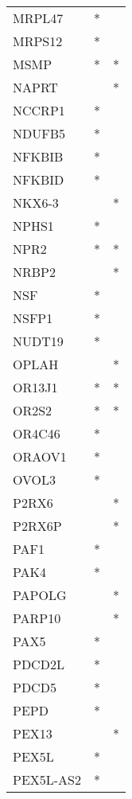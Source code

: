 \begin{longtable}{lcc}
MRPL47       &         * &         \\
MRPS12       &         * &         \\
MSMP         &         * &       * \\
NAPRT        &           &       * \\
NCCRP1       &         * &         \\
NDUFB5       &         * &         \\
NFKBIB       &         * &         \\
NFKBID       &         * &         \\
NKX6-3       &           &       * \\
NPHS1        &         * &         \\
NPR2         &         * &       * \\
NRBP2        &           &       * \\
NSF          &         * &         \\
NSFP1        &         * &         \\
NUDT19       &         * &         \\
OPLAH        &           &       * \\
OR13J1       &         * &       * \\
OR2S2        &         * &       * \\
OR4C46       &         * &         \\
ORAOV1       &         * &         \\
OVOL3        &         * &         \\
P2RX6        &           &       * \\
P2RX6P       &           &       * \\
PAF1         &         * &         \\
PAK4         &         * &         \\
PAPOLG       &           &       * \\
PARP10       &           &       * \\
PAX5         &         * &         \\
PDCD2L       &         * &         \\
PDCD5        &         * &         \\
PEPD         &         * &         \\
PEX13        &           &       * \\
PEX5L        &         * &         \\
PEX5L-AS2    &         * &         \\

\end{longtable}
